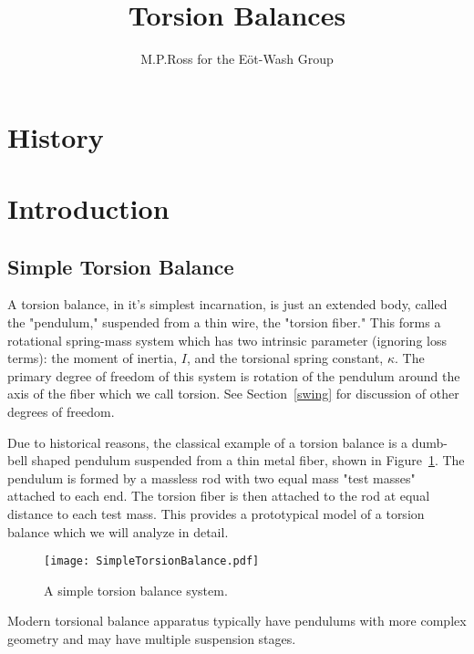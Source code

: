 \documentclass{article}
\begin{document}
\title{Torsion Balances}
\author{M.P.Ross for the E\"ot-Wash Group}

\maketitle

\tableofcontents

\pagebreak

\section{History}
\section{Introduction}
\subsection{Simple Torsion Balance}\label{simple}

\quad A torsion balance, in it's simplest incarnation, is just an extended body, called the "pendulum," suspended from a thin wire, the "torsion fiber." This forms a rotational spring-mass system which has two intrinsic parameter (ignoring loss terms): the moment of inertia, $I$, and the torsional spring constant, $\kappa$. The primary degree of freedom of this system is rotation of the pendulum around the axis of the fiber which we call torsion. See Section~\ref{swing} for discussion of other degrees of freedom.

Due to historical reasons, the classical example of a torsion balance is a dumb-bell shaped pendulum suspended from a thin metal fiber, shown in Figure~\ref{simpleFig}. The pendulum is formed by a massless rod with two equal mass "test masses" attached to each end. The torsion fiber is then attached to the rod at equal distance to each test mass. This provides a prototypical model of a torsion balance which we will analyze in detail. 

\begin{figure}[!h]
\begin{centering}
\texttt{[image: SimpleTorsionBalance.pdf]}
\caption{A simple torsion balance system.}\label{simpleFig}
\end{centering}
\end{figure}

Modern torsional balance apparatus typically have pendulums with more complex geometry and may have multiple suspension stages. 
\end{document}
